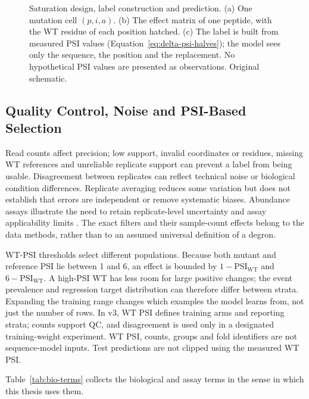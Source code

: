 \begin{figure}[htbp]
  \centering
  
  \caption[Saturation design, label construction and prediction]{Saturation design, label construction and prediction. (a) One mutation cell $(p,i,a)$.
  (b) The effect matrix of one peptide, with the WT residue of each position hatched. (c) The label is
  built from measured PSI values (Equation~\ref{eq:delta-psi-halves}); the model sees only the
  sequence, the position and the replacement. No hypothetical PSI values are presented as
  observations. Original schematic.}
  \label{fig:mutation-observation}
\end{figure}

\subsection{Quality Control, Noise and PSI-Based Selection}
Read counts affect precision; low support, invalid coordinates or residues, missing WT references and
unreliable replicate support can prevent a label from being usable. Disagreement between replicates
can reflect technical noise or biological condition differences. Replicate averaging reduces some
variation but does not establish that errors are independent or remove systematic biases. Abundance
assays illustrate the need to retain replicate-level uncertainty and assay applicability limits
\citep{matreyek2018}. The exact filters and their sample-count effects belong to the data methods,
rather than to an assumed universal definition of a degron.

WT-PSI thresholds select different populations. Because both mutant and reference PSI lie between
1 and 6, an effect is bounded by $1-\mathrm{PSI}_{\mathrm{WT}}$ and
$6-\mathrm{PSI}_{\mathrm{WT}}$. A high-PSI WT has less room for large positive changes; the event
prevalence and regression target distribution can therefore differ between strata. Expanding the
training range changes which examples the model learns from, not just the number of rows.
In v3, WT PSI defines training arms and reporting strata; counts support QC, and disagreement is used
only in a designated training-weight experiment. WT PSI, counts, groups and fold identifiers are not
sequence-model inputs. Test predictions are not clipped using the measured WT PSI.

Table~\ref{tab:bio-terms} collects the biological and assay terms in the sense in which this thesis
uses them.

